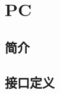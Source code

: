 \documentclass{article}
\begin{document}
\maketitle

\tableofcontents
\newpage

\section{PC\label{sec:PC}}

\subsection{简介}

\FloatBarrier
\subsection{接口定义}
\end{document}

